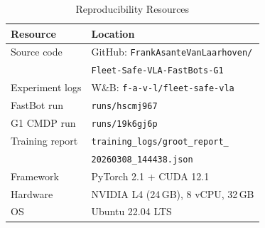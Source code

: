 \documentclass[conference]{IEEEtran}
\begin{document}
\begin{table}[h]
\centering
\caption{Reproducibility Resources}
\begin{tabular}{@{}ll@{}}
\toprule
\textbf{Resource} & \textbf{Location} \\
\midrule
Source code & GitHub: \texttt{FrankAsanteVanLaarhoven/} \\
           & \texttt{Fleet-Safe-VLA-FastBots-G1} \\
Experiment logs & W\&B: \texttt{f-a-v-l/fleet-safe-vla} \\
FastBot run & \texttt{runs/hscmj967} \\
G1 CMDP run & \texttt{runs/19k6gj6p} \\
Training report & \texttt{training\_logs/groot\_report\_} \\
               & \texttt{20260308\_144438.json} \\
Framework & PyTorch 2.1 + CUDA 12.1 \\
Hardware & NVIDIA L4 (24\,GB), 8 vCPU, 32\,GB \\
OS & Ubuntu 22.04 LTS \\
\bottomrule
\end{tabular}
\end{table}



\end{document}
